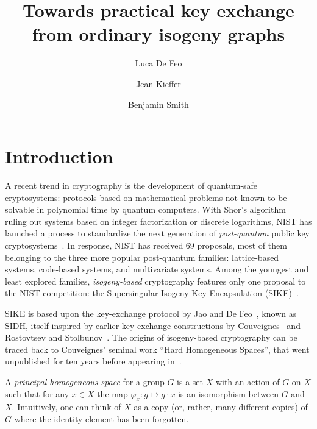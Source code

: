 \documentclass{llncs}
\begin{document}
\title{Towards practical key exchange from ordinary isogeny graphs}
\author{
  Luca De Feo \and
  Jean Kieffer \and
  Benjamin Smith}

\maketitle

\begin{abstract}

\end{abstract}

\section{Introduction}
\label{sec:introduction}

A recent trend in cryptography is the development of quantum-safe
cryptosystems: protocols based on mathematical problems not known to
be solvable in polynomial time by quantum computers. With Shor's
algorithm~\cite{shor1994algorithms} ruling out systems based on
integer factorization or discrete logarithms, NIST has launched a
process to standardize the next generation of \emph{post-quantum}
public key cryptosystems~\cite{NIST2016}. In response, NIST has
received 69 proposals, most of them belonging to the three more
popular post-quantum families: lattice-based systems, code-based
systems, and multivariate systems. Among the youngest and least
explored families, \emph{isogeny-based} cryptography features only one
proposal to the NIST competition: the Supersingular Isogeny Key
Encapsulation (SIKE)~\cite{SIKE}.

SIKE is based upon the key-exchange protocol by Jao and De
Feo~\cite{jao+defeo2011}, known as SIDH, itself inspired by earlier
key-exchange constructions by Couveignes~\cite{cryptoeprint:2006:291}
and Rostovtsev and
Stolbunov~\cite{rostovtsev+stolbunov06,stolbunov-red,Stol}. The
origins of isogeny-based cryptography can be traced back to
Couveignes' seminal work ``Hard Homogeneous Spaces'', that went
unpublished for ten years before appearing
in~\cite{cryptoeprint:2006:291}. 

A \emph{principal homogeneous space} for a group $G$ is a set $X$ with an
action of $G$ on $X$ such that for any $x∈X$ the map $φ_x:g↦g·x$ is an
isomorphism between $G$ and $X$. Intuitively, one can think of $X$ as
a copy (or, rather, many different copies) of $G$ where
the identity element has been forgotten. 
\end{document}
